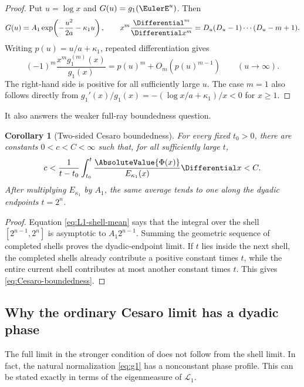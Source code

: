 \documentclass[11pt,oneside]{article}
\newtheorem{corollary}[corollary]{Corollary}
\theoremstyle{definition}
\theoremstyle{remark}
\newcommand{\Phiup}{\Phi}
\begin{document}
\begin{proof}
Put $u=\log x$ and $G(u)=g_1(\EulerE^u)$.  Then
\[
 G(u)=A_1\exp\!\left(-\frac{u^2}{2a}-\kappa_1u\right),
 \qquad
 x^m\frac{\Differential^m}{\Differential x^m}
 =D_u(D_u-1)\cdots(D_u-m+1).
\]
Writing $p(u)=u/a+\kappa_1$, repeated differentiation gives
\[
 (-1)^m\frac{x^mg_1^{(m)}(x)}{g_1(x)}
 =p(u)^m+O_m(p(u)^{m-1})
 \qquad(u\to\infty).
\]
The right-hand side is positive for all sufficiently large $u$.  The case $m=1$ also follows
directly from $g_1'(x)/g_1(x)=-(\log x/a+\kappa_1)/x<0$ for $x\ge1$.
\end{proof}

It also answers the weaker full-ray boundedness question.

\begin{corollary}[Two-sided Cesaro boundedness]
\label{cor:Cesaro-boundedness}
For every fixed $t_0>0$, there are constants $0<c<C<\infty$ such that, for all sufficiently
large $t$,
\begin{equation}
 c<\frac1{t-t_0}\int_{t_0}^{t}
 \frac{\AbsoluteValue{\Phiup(x)}}{E_{\kappa_1}(x)}\Differential x<C.
 \label{eq:Cesaro-boundedness}
\end{equation}
After multiplying $E_{\kappa_1}$ by $A_1$, the same average tends to one along the dyadic
endpoints $t=2^n$.
\end{corollary}

\begin{proof}
Equation \eqref{eq:L1-shell-mean} says that the integral over the shell
$[2^{n-1},2^n]$ is asymptotic to $A_1 2^{n-1}$.  Summing the geometric sequence of completed
shells proves the dyadic-endpoint limit.  If $t$ lies inside the next shell, the completed
shells already contribute a positive constant times $t$, while the entire current shell
contributes at most another constant times $t$.  This gives \eqref{eq:Cesaro-boundedness}.
\end{proof}

\subsection{Why the ordinary Cesaro limit has a dyadic phase}
\label{subsec:phase-profile}

The full limit in the stronger condition of \cite{mse-decay} does not follow from the shell
limit.  In fact, the natural normalization \eqref{eq:g1} has a nonconstant phase profile.
This can be stated exactly in terms of the eigenmeasure of $\mathcal L_1$.
\end{document}
